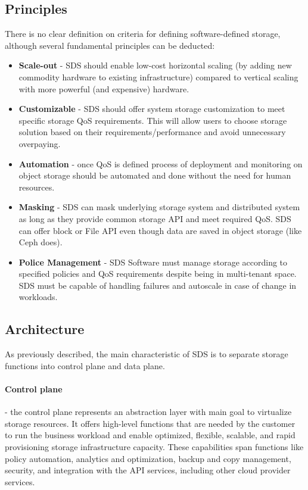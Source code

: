     \subsection{Principles}
    There is no clear definition on criteria for defining software-defined storage, although several fundamental principles can be deducted\cite{sdsGPCloudStorage}:
    \begin{itemize}
        \item \textbf{Scale-out} - SDS should enable low-cost horizontal scaling (by adding new commodity hardware to existing infrastructure) compared to vertical scaling with more powerful (and expensive) hardware.
        \item \textbf{Customizable} - SDS should offer system storage customization to meet specific storage QoS requirements. This will allow users to choose storage solution based on their requirements/performance and avoid unnecessary overpaying.
        \item \textbf{Automation} - once QoS is defined process of deployment and monitoring on object storage should be automated and done without the need for human resources.
        \item \textbf{Masking} - SDS can mask underlying storage system and distributed system as long as they provide common storage API and meet required QoS. SDS can offer block or File API even though data are saved in object storage (like Ceph does).
        \item \textbf{Police Management} - SDS Software must manage storage according to specified policies and QoS requirements despite being in multi-tenant space. SDS must be capable of handling failures and autoscale in case of change in workloads.
    \end{itemize}


    \subsection{Architecture}
    As previously described, the main characteristic of SDS is to separate storage functions into control plane and data plane.

    \paragraph{Control plane}
    - the control plane represents an abstraction layer with main goal to virtualize storage resources. It offers high-level functions that are needed by the customer to run the business workload and enable optimized, flexible, scalable, and rapid provisioning storage infrastructure capacity. These capabilities span functions like policy automation, analytics and optimization, backup and copy management, security, and integration with the API services, including other cloud provider services\cite{sdsIBMSDSGuide}.

